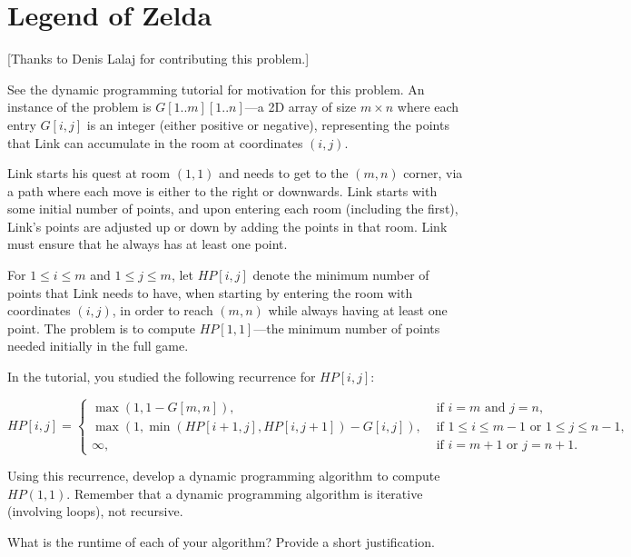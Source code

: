 \documentclass[11pt,fleqn]{exam}
\begin{document}
\newpage

\section{Legend of Zelda}

[Thanks to Denis Lalaj for contributing this problem.]

\vspace{.1in}

See the dynamic programming tutorial for motivation for this problem. An instance of the problem is $G[1..m][1..n]$---a 2D array of size $m \times n$ where each entry $G[i,j]$ is an integer (either positive or negative), representing the points  that Link can accumulate in the room at coordinates $(i,j)$. 

Link starts his quest at room $(1,1)$ and needs to get to the $(m,n)$ corner, via a path where each move is either to the right or downwards. Link starts with some initial number of points, and upon entering each room (including the first), Link's points are adjusted up or down by adding the points in that room. Link must ensure that he always has at least one point.

For $1 \le i \le m$ and $1\le j \le m$, let $HP[i,j]$ denote the minimum number of points that Link needs to have, when starting by entering the room with coordinates $(i, j)$, in order to reach $(m,n)$ while always having at least one point. The problem is to compute $HP[1,1]$---the minimum number of points needed initially in the full game.

In the tutorial, you studied the following recurrence for $HP[i,j]$:

\[
HP[i,j] = \left\{\begin{array}{ll}
\max(1, 1-G[m,n]), & \mbox{ if  $i=m$ and  $j=n$},\\
\max(1, \min(HP[i+1,j], HP[i,j+1]) -  G[i,j]), & \mbox{ if $1 \le i \le m-1$ or $1\le j \le n-1$}, \\
\infty,  & \mbox{ if $i = m+1$ or $j = n+1$}.
\end{array}
\right.
\]

\begin{questions}
\question[5]
Using this recurrence, 
develop a dynamic programming algorithm  to compute $HP(1,1)$. Remember that a dynamic programming algorithm is iterative (involving loops), not recursive.

\question[2]
What is the runtime of each of your algorithm?  Provide a short justification.

\end{questions}
\end{document}
